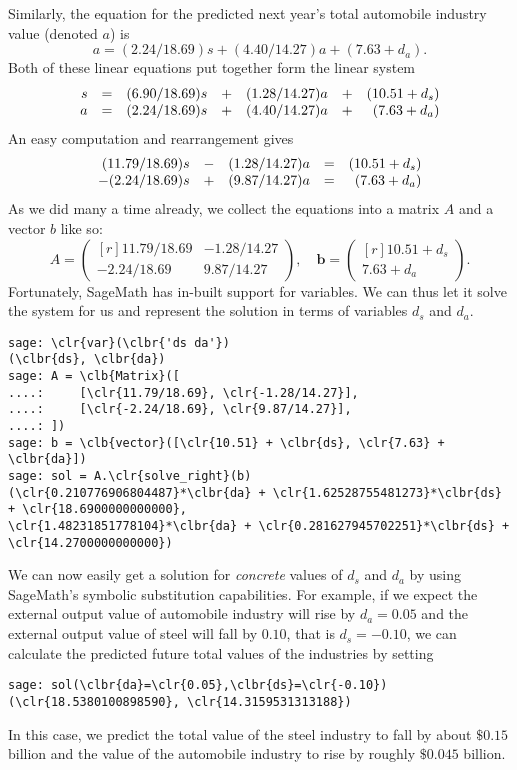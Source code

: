 Similarly, the equation for the predicted next year's total automobile industry
value (denoted $a$) is
\[
 a = (2.24 / 18.69)s + (4.40 / 14.27)a + (7.63 + d_a).
\]
Both of these linear equations put together form the linear system
\[
 \begin{array}{r c r c r c r}
  s & = & (6.90 / 18.69)s & + & (1.28 / 14.27)a & + & (10.51 + d_s)\\
  a & = & (2.24 / 18.69)s & + & (4.40 / 14.27)a & + & (7.63 + d_a)
 \end{array}
\]
An easy computation and rearrangement gives
\[
 \begin{array}{r c r c r}
  (11.79 / 18.69)s & - & (1.28 / 14.27)a & = & (10.51 + d_s)\\
  -(2.24 / 18.69)s & + & (9.87 / 14.27)a & = & (7.63 + d_a)
 \end{array}
\]
As we did many a time already, we collect the equations into a matrix $A$ and a
vector $b$ like so:
\[
 A = \left( 
  \begin{matrix*}[r]
   11.79 / 18.69 & -1.28 / 14.27\\
   -2.24 / 18.69 & 9.87 / 14.27
  \end{matrix*}
 \right), \quad \mathbf{b} = \left( 
  \begin{matrix*}[r]
   10.51 + d_s\\
   7.63 + d_a
  \end{matrix*}
 \right).
\]
Fortunately, SageMath has in-built support for variables. We can thus let it
solve the system for us and represent the solution in terms of variables $d_s$
and $d_a$.
\begin{Verbatim}
sage: \clr{var}(\clbr{'ds da'})
(\clbr{ds}, \clbr{da})
sage: A = \clb{Matrix}([
....:     [\clr{11.79/18.69}, \clr{-1.28/14.27}],
....:     [\clr{-2.24/18.69}, \clr{9.87/14.27}],
....: ])
sage: b = \clb{vector}([\clr{10.51} + \clbr{ds}, \clr{7.63} + \clbr{da}])
sage: sol = A.\clr{solve_right}(b)
(\clr{0.210776906804487}*\clbr{da} + \clr{1.62528755481273}*\clbr{ds} + \clr{18.6900000000000},
\clr{1.48231851778104}*\clbr{da} + \clr{0.281627945702251}*\clbr{ds} + \clr{14.2700000000000})
\end{Verbatim}
We can now easily get a solution for \emph{concrete} values of $d_s$ and $d_a$
by using SageMath's symbolic substitution capabilities. For example, if we
expect the external output value of automobile industry will rise by $d_a =
0.05$ and the external output value of steel will fall by $0.10$, that is $d_s =
-0.10$, we can calculate the predicted future total values of the industries by
setting
\begin{Verbatim}
sage: sol(\clbr{da}=\clr{0.05},\clbr{ds}=\clr{-0.10})
(\clr{18.5380100898590}, \clr{14.3159531313188})
\end{Verbatim}
In this case, we predict the total value of the steel industry to fall by about
$\$ 0.15$ billion and the value of the automobile industry to rise by roughly
$\$ 0.045$ billion.

